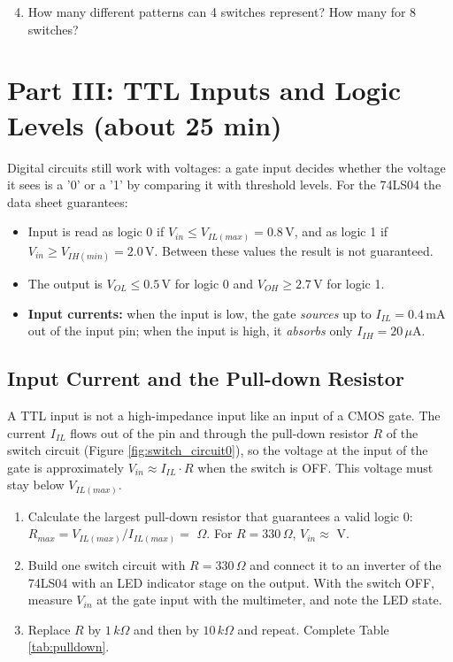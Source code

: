 \documentclass{article}
\begin{document}
\begin{enumerate}
    \setcounter{enumi}{3}
    \item How many different patterns can 4 switches represent? How many for 8 switches? \underline{\hspace{4cm}}
\end{enumerate}

\section*{Part III: TTL Inputs and Logic Levels (about 25 min)}

Digital circuits still work with voltages: a gate input decides whether the voltage it sees is a '0' or a '1' by comparing it with threshold levels. For the 74LS04 the data sheet guarantees:
\begin{itemize}
    \item Input is read as logic 0 if $V_{in} \le V_{IL(max)} = 0.8\,\mathrm{V}$, and as logic 1 if $V_{in} \ge V_{IH(min)} = 2.0\,\mathrm{V}$. Between these values the result is not guaranteed.
    \item The output is $V_{OL} \le 0.5\,\mathrm{V}$ for logic 0 and $V_{OH} \ge 2.7\,\mathrm{V}$ for logic 1.
    \item \textbf{Input currents:} when the input is low, the gate \emph{sources} up to $I_{IL} = 0.4\,\mathrm{mA}$ out of the input pin; when the input is high, it \emph{absorbs} only $I_{IH} = 20\,\mu\mathrm{A}$.
\end{itemize}

\subsection*{Input Current and the Pull-down Resistor}
A TTL input is not a high-impedance input like an input of a CMOS gate. The current $I_{IL}$ flows out of the pin and through the pull-down resistor $R$ of the switch circuit (Figure \ref{fig:switch_circuit0}), so the voltage at the input of the gate is approximately $V_{in} \approx I_{IL}\cdot R$ when the switch is OFF. This voltage must stay below $V_{IL(max)}$.

\begin{enumerate}
    \item Calculate the largest pull-down resistor that guarantees a valid logic 0: $R_{max} = V_{IL(max)}/I_{IL(max)} = $ \underline{\hspace{2cm}} $\Omega$. For $R=330\,\Omega$, $V_{in}\approx$ \underline{\hspace{2cm}} V.
    \item Build one switch circuit with $R = 330\,\Omega$ and connect it to an inverter of the 74LS04 with an LED indicator stage on the output. With the switch OFF, measure $V_{in}$ at the gate input with the multimeter, and note the LED state.
    \item Replace $R$ by $1\,k\Omega$ and then by $10\,k\Omega$ and repeat. Complete Table \ref{tab:pulldown}.
\end{enumerate}
\end{document}
